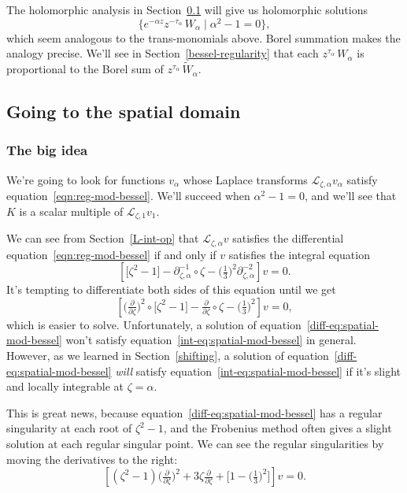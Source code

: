 \documentclass{article}
\theoremstyle{plain}
\newcommand{\laplace}{\mathcal{L}}
\newcommand{\series}[1]{\tilde{#1}}
\newcommand{\fracderiv}[3]{\partial^{#1}_{#2, #3}}
\begin{document}
The holomorphic analysis in Section~\ref{spatial} will give us holomorphic solutions
\[ \{ e^{-\alpha z} z^{-\tau_\alpha}\,W_\alpha \mid \alpha^2 - 1 = 0 \}, \]
which seem analogous to the trans-monomials above. Borel summation makes the analogy precise. We'll see in Section~\ref{bessel-regularity} that each $z^{\tau_\alpha}\,W_\alpha$ is proportional to the Borel sum of $z^{\tau_\alpha}\,\series{W}_\alpha$.
\subsection{Going to the spatial domain}\label{spatial}
\subsubsection{The big idea}\label{big-idea}
We're going to look for functions $v_\alpha$ whose Laplace transforms $\laplace_{\zeta, \alpha} v_\alpha$ satisfy equation~\ref{eqn:reg-mod-bessel}. We'll succeed when $\alpha^2 - 1 = 0$, and we'll see that $K$ is a scalar multiple of $\laplace_{\zeta, 1} v_1$.

We can see from Section~\ref{L-int-op} that $\laplace_{\zeta, \alpha} v$ satisfies the differential equation~\ref{eqn:reg-mod-bessel} if and only if $v$ satisfies the integral equation
\begin{equation}\label{int-eq:spatial-mod-bessel}
\left[ \big[ \zeta^2 - 1 \big] - \fracderiv{-1}{\zeta}{\alpha} \circ \zeta - \big(\tfrac{1}{3}\big)^2 \fracderiv{-2}{\zeta}{\alpha} \right] v = 0.
\end{equation}
It's tempting to differentiate both sides of this equation until we get
\begin{equation}\label{diff-eq:spatial-mod-bessel}
\left[ \big(\tfrac{\partial}{\partial \zeta}\big)^2 \circ \big[ \zeta^2 - 1 \big] - \tfrac{\partial}{\partial \zeta} \circ \zeta - \big(\tfrac{1}{3}\big)^2 \right] v = 0,
\end{equation}
which is easier to solve. Unfortunately, a solution of equation~\ref{diff-eq:spatial-mod-bessel} won't satisfy equation~\ref{int-eq:spatial-mod-bessel} in general. However, as we learned in Section~\ref{shifting}, a solution of equation~\ref{diff-eq:spatial-mod-bessel} {\em will} satisfy equation~\ref{int-eq:spatial-mod-bessel} if it's slight and locally integrable at $\zeta = \alpha$.

This is great news, because equation~\ref{diff-eq:spatial-mod-bessel} has a regular singularity at each root of $\zeta^2 - 1$, and the Frobenius method often gives a slight solution at each regular singular point. We can see the regular singularities by moving the derivatives to the right:
\[ \left[ (\zeta^2 - 1) \big(\tfrac{\partial}{\partial \zeta}\big)^2 + 3\zeta \tfrac{\partial}{\partial \zeta} + \big[ 1 - \big(\tfrac{1}{3}\big)^2 \big] \right] v = 0. \]
\end{document}
